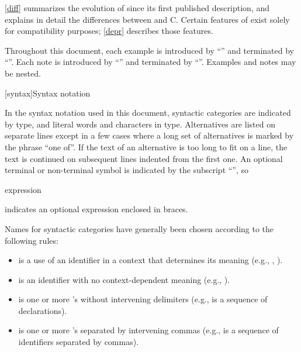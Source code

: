 \pnum
\ref{diff} summarizes the evolution of \Cpp  since its first
published description, and explains in detail the differences between
\Cpp  and C\@. Certain features of \Cpp  exist solely for compatibility
purposes; \ref{depr} describes those features.

\pnum
Throughout this document, each example is introduced by
``'' and terminated by ``''. Each note is
introduced by ``'' and terminated by ``''. Examples
and notes may be nested.%

[syntax]{Syntax notation}

\pnum
{}%
In the syntax notation used in this document, syntactic
categories are indicated by  type, and literal words
and characters in   type. Alternatives are
listed on separate lines except in a few cases where a long set of
alternatives is marked by the phrase ``one of''. If the text of an alternative is too long to fit on a line, the text is continued on subsequent lines indented from the first one.
An optional terminal or non-terminal symbol is indicated by the subscript
``\opt'', so

\begin{ncbnf}
\terminal{\{} expression\opt{} \terminal{\}}
\end{ncbnf}

indicates an optional expression enclosed in braces.%

\pnum
Names for syntactic categories have generally been chosen according to
the following rules:
\begin{itemize}
\item {} is a use of an identifier in a context that
determines its meaning (e.g., ,
).
\item {} is an identifier with no context-dependent meaning
(e.g., ).
\item {} is one or more 's without intervening
delimiters (e.g.,  is a sequence of
declarations).
\item {} is one or more 's separated by
intervening commas (e.g.,  is a sequence of
identifiers separated by commas).
\end{itemize}%

